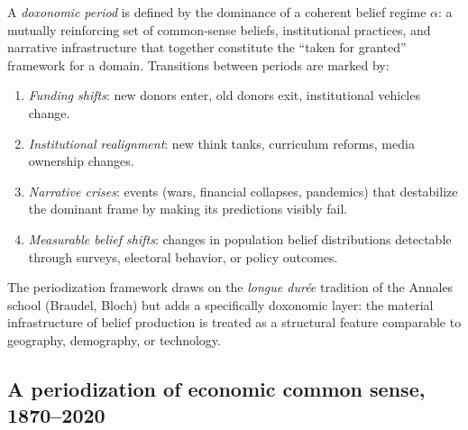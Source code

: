 \begin{model}
\label{mod:periodization}
A \emph{doxonomic period} is defined by the dominance of a coherent belief regime $\alpha$: a mutually reinforcing set of common-sense beliefs, institutional practices, and narrative infrastructure that together constitute the ``taken for granted'' framework for a domain.
Transitions between periods are marked by:
\begin{enumerate}[nosep]
  \item \emph{Funding shifts}: new donors enter, old donors exit, institutional vehicles change.
  \item \emph{Institutional realignment}: new think tanks, curriculum reforms, media ownership changes.
  \item \emph{Narrative crises}: events (wars, financial collapses, pandemics) that destabilize the dominant frame by making its predictions visibly fail.
  \item \emph{Measurable belief shifts}: changes in population belief distributions detectable through surveys, electoral behavior, or policy outcomes.
\end{enumerate}
\end{model}

The periodization framework draws on the \emph{longue dur\'{e}e} tradition of the Annales school (Braudel, Bloch) but adds a specifically doxonomic layer: the material infrastructure of belief production is treated as a structural feature comparable to geography, demography, or technology.

\subsection{A periodization of economic common sense, 1870--2020}

